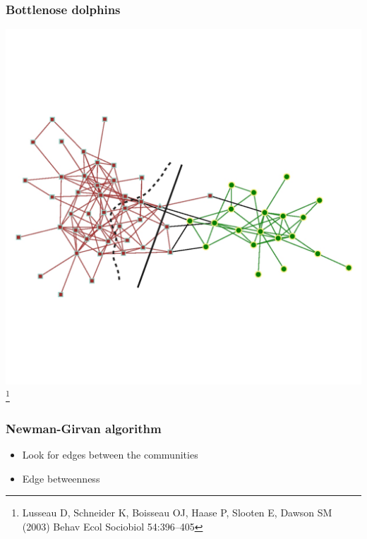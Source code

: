 \documentclass{beamer}
\begin{document}
\begin{frame}
    \frametitle{Bottlenose dolphins}
    \centering
    \includegraphics[width=\columnwidth, trim = 0 120 0 100, clip = true]{dolphins_communities.pdf}
\footnote{\footnotesize Lusseau D, Schneider K, Boisseau OJ, Haase P, Slooten E, Dawson SM (2003) Behav Ecol Sociobiol 54:396–405}
\end{frame}
\begin{frame}
    \frametitle{Newman-Girvan algorithm}
    \centering
    
    \begin{itemize}
        \setlength\itemsep{1em}
        \item{Look for edges between the communities}

        \item{Edge betweenness}
    \end{itemize}
\end{frame}
\end{document}
